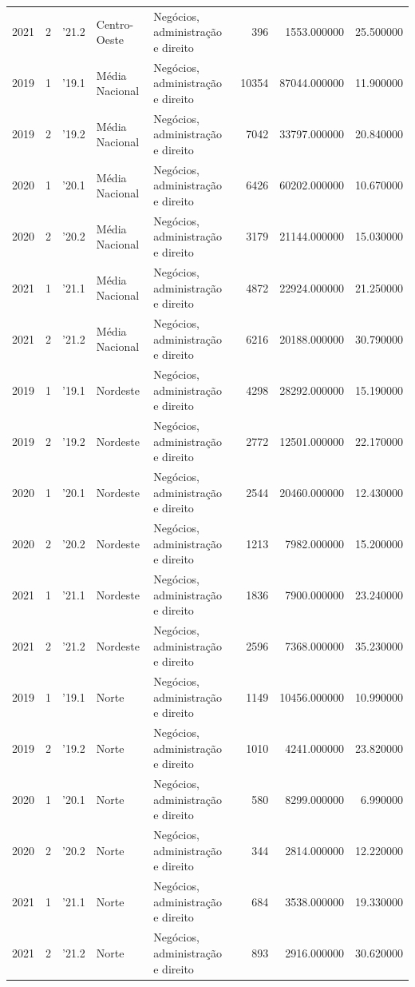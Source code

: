 \begin{longtable}{rrlllrrr}
2021 & 2 & '21.2 & Centro-Oeste & Negócios, administração e direito & 396 & 1553.000000 & 25.500000 \\
2019 & 1 & '19.1 & Média Nacional & Negócios, administração e direito & 10354 & 87044.000000 & 11.900000 \\
2019 & 2 & '19.2 & Média Nacional & Negócios, administração e direito & 7042 & 33797.000000 & 20.840000 \\
2020 & 1 & '20.1 & Média Nacional & Negócios, administração e direito & 6426 & 60202.000000 & 10.670000 \\
2020 & 2 & '20.2 & Média Nacional & Negócios, administração e direito & 3179 & 21144.000000 & 15.030000 \\
2021 & 1 & '21.1 & Média Nacional & Negócios, administração e direito & 4872 & 22924.000000 & 21.250000 \\
2021 & 2 & '21.2 & Média Nacional & Negócios, administração e direito & 6216 & 20188.000000 & 30.790000 \\
2019 & 1 & '19.1 & Nordeste & Negócios, administração e direito & 4298 & 28292.000000 & 15.190000 \\
2019 & 2 & '19.2 & Nordeste & Negócios, administração e direito & 2772 & 12501.000000 & 22.170000 \\
2020 & 1 & '20.1 & Nordeste & Negócios, administração e direito & 2544 & 20460.000000 & 12.430000 \\
2020 & 2 & '20.2 & Nordeste & Negócios, administração e direito & 1213 & 7982.000000 & 15.200000 \\
2021 & 1 & '21.1 & Nordeste & Negócios, administração e direito & 1836 & 7900.000000 & 23.240000 \\
2021 & 2 & '21.2 & Nordeste & Negócios, administração e direito & 2596 & 7368.000000 & 35.230000 \\
2019 & 1 & '19.1 & Norte & Negócios, administração e direito & 1149 & 10456.000000 & 10.990000 \\
2019 & 2 & '19.2 & Norte & Negócios, administração e direito & 1010 & 4241.000000 & 23.820000 \\
2020 & 1 & '20.1 & Norte & Negócios, administração e direito & 580 & 8299.000000 & 6.990000 \\
2020 & 2 & '20.2 & Norte & Negócios, administração e direito & 344 & 2814.000000 & 12.220000 \\
2021 & 1 & '21.1 & Norte & Negócios, administração e direito & 684 & 3538.000000 & 19.330000 \\
2021 & 2 & '21.2 & Norte & Negócios, administração e direito & 893 & 2916.000000 & 30.620000 \\

\end{longtable}
